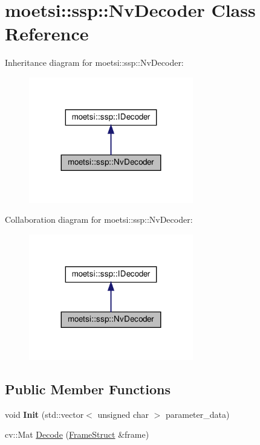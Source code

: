 \hypertarget{classmoetsi_1_1ssp_1_1NvDecoder}{}\section{moetsi\+:\+:ssp\+:\+:Nv\+Decoder Class Reference}
\label{classmoetsi_1_1ssp_1_1NvDecoder}


Inheritance diagram for moetsi\+:\+:ssp\+:\+:Nv\+Decoder\+:\nopagebreak
\begin{figure}[H]
\begin{center}
\leavevmode
\includegraphics[width=203pt]{classmoetsi_1_1ssp_1_1NvDecoder__inherit__graph}
\end{center}
\end{figure}


Collaboration diagram for moetsi\+:\+:ssp\+:\+:Nv\+Decoder\+:\nopagebreak
\begin{figure}[H]
\begin{center}
\leavevmode
\includegraphics[width=203pt]{classmoetsi_1_1ssp_1_1NvDecoder__coll__graph}
\end{center}
\end{figure}
\subsection*{Public Member Functions}
\begin{DoxyCompactItemize}
\item 
\mbox{\label{classmoetsi_1_1ssp_1_1NvDecoder_a004e8a1ed5618df951477c9bb955b6ec}} 
void {\bfseries Init} (std\+::vector$<$ unsigned char $>$ parameter\+\_\+data)
\item 
cv\+::\+Mat \hyperlink{classmoetsi_1_1ssp_1_1NvDecoder_a78eb894b6825ac5ec57f5a4f4ecd7e31}{Decode} (\hyperlink{structmoetsi_1_1ssp_1_1FrameStruct}{Frame\+Struct} \&frame)
\end{DoxyCompactItemize}



